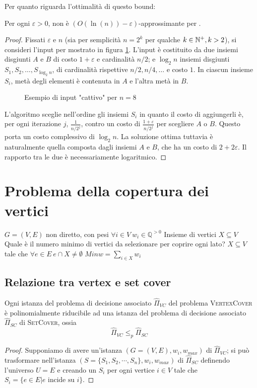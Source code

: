 Per quanto riguarda l'ottimalità di questo bound:
\begin{theorem}
	Per ogni $\varepsilon>0$, \GreedySetCover non è $(O(\ln(n))-\varepsilon)$-approssimante per \MinSetCover.
\end{theorem}
\begin{proof}
	Fissati $\varepsilon$ e $n$ (sia per semplicità $n=2^k$ per qualche $k\in\mathbb N^+,k>2$), si consideri l'input per \MinSetCover mostrato in figura \ref{fig:setcover_tightness}.
	L'input è costituito da due insiemi disgiunti $A$ e $B$ di costo $1+\varepsilon$ e cardinalità $n/2$; e $\log_2 n$ insiemi disgiunti $S_1,S_2,\dots,S_{\log_2 n}$, di cardinalità rispettive $n/2,n/4,\dots$ e costo $1$. In ciascun insieme $S_i$, metà degli elementi è contenuta in $A$ e l'altra metà in $B$.

	\begin{figure}[ht]
		\centering
		
		\caption{Esempio di input "cattivo" per $n=8$}
		\label{fig:setcover_tightness}
	\end{figure}

	L'algoritmo sceglie nell'ordine gli insiemi $S_i$ in quanto il costo di aggiungerli è, per ogni iterazione $j$, $\frac{1}{n/2^j}$, contro un costo di $\frac{1+\varepsilon}{n/2^j}$ per scegliere $A$ o $B$.
	Questo porta un costo complessivo di $\log_2 n$. La soluzione ottima tuttavia è naturalmente quella composta dagli insiemi $A$ e $B$, che ha un costo di $2+2\varepsilon$. Il rapporto tra le due è necessariamente logaritmico.
\end{proof}



\section{Problema della copertura dei vertici}
 {$G = (V,E)$ non diretto, con pesi
	$\forall i \in V ~ w_i \in \mathbb{Q}^{>0}$}
{Insieme di vertici $X \subseteq V$}
{Quale è il numero minimo di vertici da selezionare per coprire ogni lato?}
{$X \subseteq V$ tale che $\forall e \in E ~ e \cap X \neq \emptyset$}
{$Min$}{$w = \sum_{i \in X} w_i$}

\subsection{Relazione tra vertex e set cover}
\begin{theorem}\label{thm:vc_polyred_sc}
	Ogni istanza del problema di decisione associato $\hat{\Pi}_{VC}$ del problema \textsc{VertexCover} è
	polinomialmente riducibile ad una istanza del problema di decisione associato
	$\hat{\Pi}_{SC}$ di \textsc{SetCover}, ossia
	$$
		\hat{\Pi}_{VC} \leq_p \hat{\Pi}_{SC}
	$$
\end{theorem}
\begin{proof}
	Supponiamo di avere un'istanza $(G=(V,E), w_i, w_{max})$ di
	$\hat{\Pi}_{VC}$; si può trasformare nell'istanza
	$(S= \{S_1, S_2, \cdots, S_n\}, w_i, w_{max})$ di $\hat{\Pi}_{SC}$ 
	definendo l'universo $U=E$ e creando un $S_i$ per ogni vertice $i \in V$ tale che 
	$S_i = \{e \in E | e \text{ incide su } i\}$.
\end{proof}

